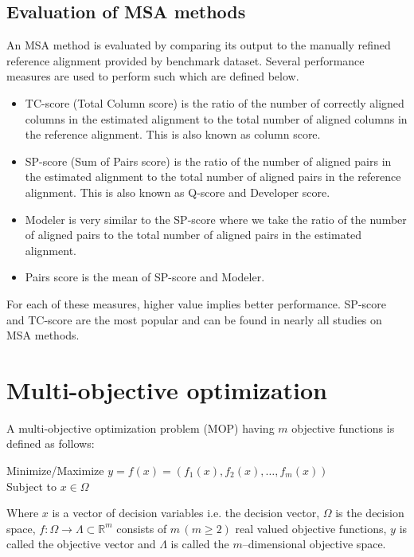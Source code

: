 \subsection{Evaluation of MSA methods}
An MSA method is evaluated by comparing its output to the manually refined reference alignment provided by benchmark dataset. Several performance measures are used to perform such which are defined below. 
\begin{itemize}
	\item TC-score (Total Column score) is the ratio of the number of correctly aligned columns in the estimated alignment to the total number of aligned columns in the reference alignment. This is also known as column score.
	
	\item SP-score (Sum of Pairs score) is the ratio of the number of aligned pairs in the estimated alignment to the total number of aligned pairs in the reference alignment. This is also known as Q-score and Developer score.
	
	\item Modeler is very similar to the SP-score where we take the ratio of the number of aligned pairs to the total number of aligned pairs in the estimated alignment.
	
	\item Pairs score is the mean of SP-score and Modeler.   %
\end{itemize}
For each of these measures, higher value implies better performance. SP-score and TC-score are the most popular and can be found in nearly all studies on MSA methods.


\section{Multi-objective optimization}
\label{sec:MaOEA_background}
A multi-objective optimization problem (MOP) having $m$ objective functions is defined as follows:
\begin{center}
	Minimize/Maximize $y = f(x) = (f_1(x), f_2(x),\dots,f_m(x))$\\
	Subject to $x \in \Omega$
\end{center}

Where $x$ is a vector of decision variables i.e. the decision vector, $\Omega$ is the decision  space, $f:\Omega \rightarrow \Lambda \subset \mathbb{R}^m $ consists of $ m \, (m \ge 2) $ real valued objective functions, $y$ is called the objective vector and $\Lambda$ is called the $m$--dimensional objective space.  

